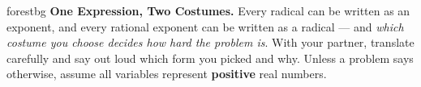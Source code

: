 \documentclass[10pt]{article}
\begin{document}
\namepartnerperiod

\vspace{0.08in}

\begin{headlinebox}{forestbg}
\small\textbf{One Expression, Two Costumes.} Every radical can be written as an exponent, and every
rational exponent can be written as a radical --- and \emph{which costume you choose decides how
hard the problem is}. With your partner, translate carefully and say out loud which form you picked
and why. Unless a problem says otherwise, assume all variables represent \textbf{positive} real
numbers.
\end{headlinebox}

\vspace{0.06in}
\end{document}
